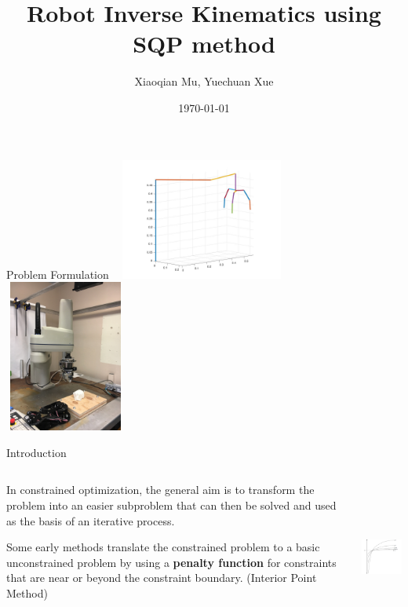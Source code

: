 \documentclass[10pt, compress]{beamer}
\title{Robot Inverse Kinematics using SQP method}
\subtitle{}
\date{\today}
\author{Xiaoqian Mu, Yuechuan Xue}
\institute{Iowa State University}
\begin{document}
\maketitle

\begin{frame}[fragile]{Problem Formulation}
\includegraphics[width=6cm, height=4cm]{robot-matlab-config.jpg}
\includegraphics[width=4cm, height=5cm]{IMG_5860.jpg}
\end{frame}



\begin{frame}[fragile]{Introduction}
\begin{columns}
\begin{column}{0.5\textwidth}
In constrained optimization, the general aim is to transform the problem into an easier subproblem that can then be solved and used as the basis of an iterative process.

\vspace{0.1in}

Some early methods translate the constrained problem to a basic unconstrained problem by using a \textbf{penalty function} for constraints  that are near or beyond the constraint boundary. (Interior Point Method)
\end{column}
\begin{column}{0.5\textwidth}  %
    \begin{center}
\includegraphics[width=4cm, height=5cm]{interior-point-method.png}
     \end{center}
\end{column}
\end{columns}
\end{frame}
\end{document}
